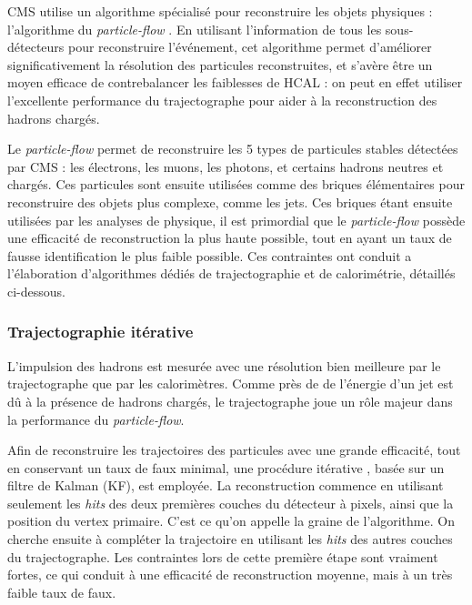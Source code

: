 CMS utilise un algorithme spécialisé pour reconstruire les objets physiques : l'algorithme du \emph{particle-flow} \citep{pf,cms_pf_2,cms_pf_jets,cms_pf_leptons}. En utilisant l'information de tous les sous-détecteurs pour reconstruire l'événement, cet algorithme permet d'améliorer significativement la résolution des particules reconstruites, et s'avère être un moyen efficace de contrebalancer les faiblesses de HCAL : on peut en effet utiliser l'excellente performance du trajectographe pour aider à la reconstruction des hadrons chargés.

Le \emph{particle-flow} permet de reconstruire les 5 types de particules stables détectées par CMS : les électrons, les muons, les photons, et certains hadrons neutres et chargés. Ces particules sont ensuite utilisées comme des briques élémentaires pour reconstruire des objets plus complexe, comme les jets. Ces briques étant ensuite utilisées par les analyses de physique, il est primordial que le \emph{particle-flow} possède une efficacité de reconstruction la plus haute possible, tout en ayant un taux de fausse identification le plus faible possible. Ces contraintes ont conduit a l'élaboration d'algorithmes dédiés de trajectographie et de calorimétrie, détaillés ci-dessous.

\subsubsection{Trajectographie itérative} \label{sec:tracks_reconstruction}

L'impulsion des hadrons est mesurée avec une résolution bien meilleure par le trajectographe que par les calorimètres. Comme près de  de l'énergie d'un jet est dû à la présence de hadrons chargés, le trajectographe joue un rôle majeur dans la performance du \emph{particle-flow}.

Afin de reconstruire les trajectoires des particules avec une grande efficacité, tout en conservant un taux de faux minimal, une procédure itérative \citep{cms_tracks}, basée sur un filtre de Kalman (KF), est employée. La reconstruction commence en utilisant seulement les \emph{hits} des deux premières couches du détecteur à pixels, ainsi que la position du vertex primaire. C'est ce qu'on appelle la graine de l'algorithme. On cherche ensuite à compléter la trajectoire en utilisant les \emph{hits} des autres couches du trajectographe. Les contraintes lors de cette première étape sont vraiment fortes, ce qui conduit à une efficacité de reconstruction moyenne, mais à un très faible taux de faux.

